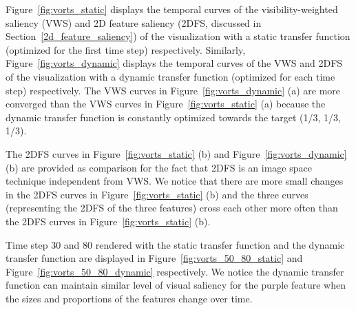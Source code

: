 Figure~\ref{fig:vorts_static} displays the temporal curves of the visibility-weighted saliency (VWS) and 2D feature saliency (2DFS, discussed in Section~\ref{2d_feature_saliency}) of the visualization with a static transfer function (optimized for the first time step) respectively.
Similarly, Figure~\ref{fig:vorts_dynamic} displays the temporal curves of the VWS and 2DFS of the visualization with a dynamic transfer function (optimized for each time step) respectively.
The VWS curves in Figure~\ref{fig:vorts_dynamic} (a) are more converged than the VWS curves in Figure~\ref{fig:vorts_static} (a) because the dynamic transfer function is constantly optimized towards the target (1/3, 1/3, 1/3).

The 2DFS curves in Figure~\ref{fig:vorts_static} (b) and Figure~\ref{fig:vorts_dynamic} (b) are provided as comparison for the fact that 2DFS is an image space technique independent from VWS. We notice that there are more small changes in the 2DFS curves in Figure~\ref{fig:vorts_static} (b) and the three curves (representing the 2DFS of the three features) cross each other more often than the 2DFS curves in Figure~\ref{fig:vorts_static} (b).

Time step 30 and 80 rendered with the static transfer function and the dynamic transfer function are displayed in Figure~\ref{fig:vorts_50_80_static} and Figure~\ref{fig:vorts_50_80_dynamic} respectively. We notice the dynamic transfer function can maintain similar level of visual saliency for the purple feature when the sizes and proportions of the features change over time.


%

%



